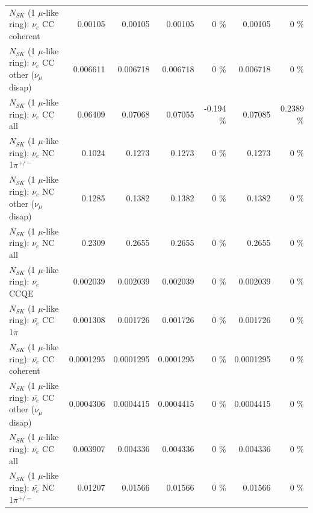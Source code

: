 \begin{table}
\begin{tabular}{| l | r | r | r  r | r  r |}
                               $N_{SK}$ (1 $\mu$-like ring): $\nu_e$ CC coherent &         0.00105 &         0.00105 &         0.00105 &        0 \%  &         0.00105 &        0 \%  \\ 
                $N_{SK}$ (1 $\mu$-like ring): $\nu_e$ CC other ($\nu_\mu$ disap) &        0.006611 &        0.006718 &        0.006718 &        0 \%  &        0.006718 &        0 \%  \\ 
                                  $N_{SK}$ (1 $\mu$-like ring): $\nu_{e}$ CC all &         0.06409 &         0.07068 &         0.07055 &   -0.194 \%  &         0.07085 &   0.2389 \%  \\ 
\hline
                           $N_{SK}$ (1 $\mu$-like ring): $\nu_e$ NC 1$\pi^{+/-}$ &          0.1024 &          0.1273 &          0.1273 &        0 \%  &          0.1273 &        0 \%  \\ 
                $N_{SK}$ (1 $\mu$-like ring): $\nu_e$ NC other ($\nu_\mu$ disap) &          0.1285 &          0.1382 &          0.1382 &        0 \%  &          0.1382 &        0 \%  \\ 
                                  $N_{SK}$ (1 $\mu$-like ring): $\nu_{e}$ NC all &          0.2309 &          0.2655 &          0.2655 &        0 \%  &          0.2655 &        0 \%  \\ 
\hline
\hline
\hline
                                $N_{SK}$ (1 $\mu$-like ring): $\bar{\nu_e}$ CCQE &        0.002039 &        0.002039 &        0.002039 &        0 \%  &        0.002039 &        0 \%  \\ 
                           $N_{SK}$ (1 $\mu$-like ring): $\bar{\nu_e}$ CC 1$\pi$ &        0.001308 &        0.001726 &        0.001726 &        0 \%  &        0.001726 &        0 \%  \\ 
                         $N_{SK}$ (1 $\mu$-like ring): $\bar{\nu_e}$ CC coherent &       0.0001295 &       0.0001295 &       0.0001295 &        0 \%  &       0.0001295 &        0 \%  \\ 
          $N_{SK}$ (1 $\mu$-like ring): $\bar{\nu_e}$ CC other ($\nu_\mu$ disap) &       0.0004306 &       0.0004415 &       0.0004415 &        0 \%  &       0.0004415 &        0 \%  \\ 
                            $N_{SK}$ (1 $\mu$-like ring): $\bar{\nu_{e}}$ CC all &        0.003907 &        0.004336 &        0.004336 &        0 \%  &        0.004336 &        0 \%  \\ 
\hline
                     $N_{SK}$ (1 $\mu$-like ring): $\bar{\nu_e}$ NC 1$\pi^{+/-}$ &         0.01207 &         0.01566 &         0.01566 &        0 \%  &         0.01566 &        0 \%  \\ 

\end{tabular}
\end{table}
